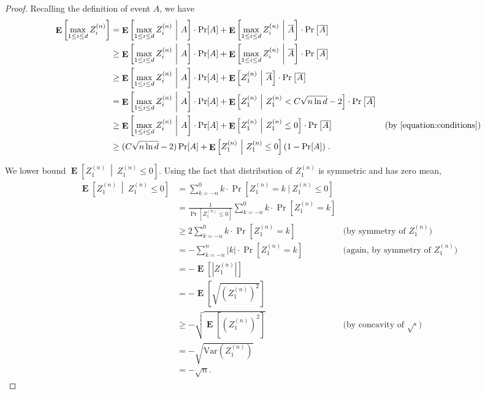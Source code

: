 \documentclass{article}
\DeclareMathOperator*{\Exp}{\mathbf{E}}
\newcommand{\Var}{\mathrm{Var}}
\begin{document}
\begin{proof}
Recalling the definition of event $A$, we have
\begin{align*}
\Exp \left[ \max_{1 \le i \le d} Z^{(n)}_i \right]
& = \Exp \left[ \max_{1 \le i \le d} Z^{(n)}_i ~ \middle|~ A \right] \cdot \Pr[A] + \Exp \left[ \max_{1 \le i \le d} Z^{(n)}_i ~\middle|~ \overline{A} \right] \cdot \Pr \left[ \overline{A} \right] \\
& \ge \Exp \left[ \max_{1 \le i \le d} Z^{(n)}_i ~\middle|~ A \right] \cdot \Pr[A] + \Exp \left[ \max_{1 \le i \le d} Z^{(n)}_i ~\middle|~ \overline{A} \right] \cdot \Pr \left[ \overline{A} \right]\\
& \ge \Exp \left[ \max_{1 \le i \le d} Z^{(n)}_i ~\middle|~ A \right] \cdot \Pr[A] + \Exp\left[ Z^{(n)}_1 ~\middle|~ \overline{A} \right] \cdot \Pr \left[ \overline{A} \right] \\
& = \Exp \left[ \max_{1 \le i \le d} Z^{(n)}_i ~\middle|~ A \right] \cdot \Pr[A] + \Exp \left[ Z^{(n)}_1 ~\middle|~ Z^{(n)}_1 < C \sqrt{n \ln d} - 2 \right] \cdot \Pr \left[ \overline{A} \right]\\
& \ge \Exp \left[ \max_{1 \le i \le d} Z^{(n)}_i ~\middle|~ A \right] \cdot \Pr[A] + \Exp \left[ Z^{(n)}_1 ~\middle|~ Z^{(n)}_1 \le 0 \right] \cdot \Pr \left[ \overline{A} \right] & \text{(by \eqref{equation:conditions})} \\
& \ge (C \sqrt{n \ln d} - 2) \Pr[A] + \Exp \left[ Z^{(n)}_1 ~\middle|~ Z^{(n)}_1 \le 0 \right] (1 - \Pr[A]) \; .
\end{align*}

We lower bound $\Exp \left[ Z^{(n)}_1 ~\middle|~ Z^{(n)}_1 \le 0 \right]$. Using the fact that distribution of $Z^{(n)}_1$ is symmetric and has zero mean,
\begin{align*}
\Exp \left[ Z^{(n)}_1 ~\middle|~ Z^{(n)}_1 \le 0 \right]
& = \sum_{k=-n}^0 k \cdot \Pr[Z^{(n)}_1 = k ~|~ Z^{(n)}_1 \le 0] \\
& = \frac{1}{\Pr[Z^{(n)}_1 \le 0]} \sum_{k=-n}^0 k \cdot \Pr[Z^{(n)}_1 = k] \\
& \ge 2 \sum_{k=-n}^0 k \cdot \Pr[Z^{(n)}_1 = k] & \text{(by symmetry of $Z^{(n)}_1$)} \\
& = - \sum_{k=-n}^n |k| \cdot \Pr[Z^{(n)}_1 = k] & \text{(again, by symmetry of $Z^{(n)}_1$)} \\
& = - \Exp[|Z^{(n)}_1|] \\
& = - \Exp \left[ \sqrt{ \left( Z^{(n)}_1 \right)^2} \right] \\
& \ge - \sqrt{\Exp \left[ \left( Z^{(n)}_1 \right)^2 \right]} & \text{(by concavity of $\sqrt{\cdot}$)} \\
& = - \sqrt{\Var \left( Z^{(n)}_1 \right)} \\
& = -\sqrt{n}.
\end{align*}


\end{proof}
\end{document}

